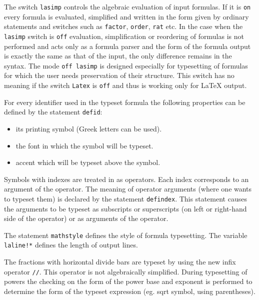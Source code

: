 The switch {\tt lasimp} controls the algebraic evaluation of input
formulas.  If it is {\tt on} every formula is evaluated, simplified and
written in the form given by ordinary \REDUCE{} statements and switches
such as {\tt factor}, {\tt order}, {\tt rat} etc.  In the case when the
{\tt lasimp} switch is {\tt off} evaluation, simplification or
reordering of formulas is not performed and \REDUCE{} acts only as a
formula parser and the form of the formula output is exactly the same as
that of the input, the only difference remains in the syntax.  The mode
{\tt off lasimp} is designed especially for typesetting of formulas for
which the user needs preservation of their structure.  This switch has
no meaning if the switch {\tt Latex} is {\tt off} and thus is working
only for \LaTeX{} output.

For every  identifier  used  in  the  typeset  \REDUCE{}  formula
the following properties can be defined by the statement {\tt defid}:
\begin{itemize}
\item its printing symbol (Greek letters can be used).
\item the font in which the symbol will be typeset.
\item accent which will be typeset above the symbol.
\end{itemize}

Symbols with indexes are treated in \REDUCE{} as operators.  Each index
corresponds to an argument of the operator.  The meaning of operator
arguments (where one wants to typeset them) is declared by the statement
{\tt defindex}.  This statement causes the arguments to be typeset as
subscripts or superscripts (on left or right-hand side of the operator)
or as arguments of the operator.

The statement {\tt mathstyle} defines the style of formula typesetting.
The variable {\tt laline!*} defines the length of output lines.

The fractions with horizontal divide bars are typeset by using the
new \REDUCE{} infix operator \verb+//+.  This operator is not
algebraically simplified.  During typesetting of powers the checking on
the form of the power base and exponent is performed to determine the
form of the typeset expression (eg.  sqrt symbol, using parentheses).

